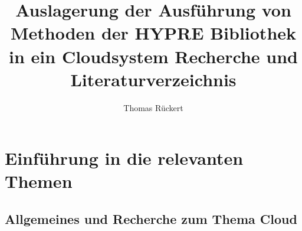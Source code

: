 \documentclass[a4paper,10pt]{article}
\title{Auslagerung der Ausführung von Methoden der HYPRE Bibliothek in ein Cloudsystem
Recherche und Literaturverzeichnis}
\author{Thomas Rückert}
\numberwithin{figure}{section}
\numberwithin{table}{section}
\newcommand{\blankpage}{
\newpage
\thispagestyle{empty}
\mbox{}
\newpage
}
\begin{document}
\newcommand{\mycheckbox}[0]{\makebox[0pt][l]{$\square$}\raisebox{0.15ex}{\hspace{0.1em}$\checkmark$}}
\newcommand{\myuncheckbox}[0]{\makebox[0em][l]{$\square$}\raisebox{0.15ex}{\hspace{0.1em}$ $}}

\newenvironment{my-boxed}[1]
{\begin{center}Definition\\
\begin{tabular}{|p{0.9\textwidth}|}
\hline\\
\textbf{#1}\\\\
}
{
\\\\\hline
\end{tabular}
\end{center}
}


\maketitle
\thispagestyle{empty}
\blankpage
\setcounter{page}{1}
\renewcommand{\thepage}{\roman{page}}


\begin{abstract}
\end{abstract}
\blankpage


\tableofcontents
\newpage

\listoffigures
\newpage

\listoftables
\newpage

\lstlistoflistings
\newpage

\listoftodos
\newpage

\setcounter{page}{1}
\renewcommand{\thepage}{\arabic{page}}



\section{Einführung in die relevanten Themen}

\subsection{Allgemeines und Recherche zum Thema Cloud}
\end{document}
